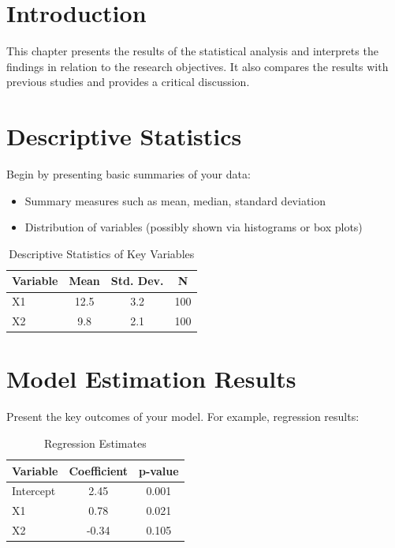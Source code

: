 \section{Introduction}
This chapter presents the results of the statistical analysis and interprets the findings in relation to the research objectives. It also compares the results with previous studies and provides a critical discussion.

\section{Descriptive Statistics}
Begin by presenting basic summaries of your data:
\begin{itemize}
    \item Summary measures such as mean, median, standard deviation
    \item Distribution of variables (possibly shown via histograms or box plots)
\end{itemize}

\begin{table}[H]
    \centering
    \caption{Descriptive Statistics of Key Variables}
    \begin{tabular}{lccc} \hline
        \textbf{Variable} & \textbf{Mean} & \textbf{Std. Dev.} & \textbf{N} \\ \hline
        X1 & 12.5 & 3.2 & 100 \\
        X2 & 9.8 & 2.1 & 100 \\ \hline
    \end{tabular}
    \label{tab:desc}
\end{table}

\section{Model Estimation Results}
Present the key outcomes of your model. For example, regression results:

\begin{table}[H]
    \centering
    \caption{Regression Estimates}
    \begin{tabular}{lcc} \hline
        \textbf{Variable} & \textbf{Coefficient} & \textbf{p-value} \\ \hline
        Intercept & 2.45 & 0.001 \\
        X1 & 0.78 & 0.021 \\
        X2 & -0.34 & 0.105 \\ \hline
    \end{tabular}
    \label{tab:regression}
\end{table}

